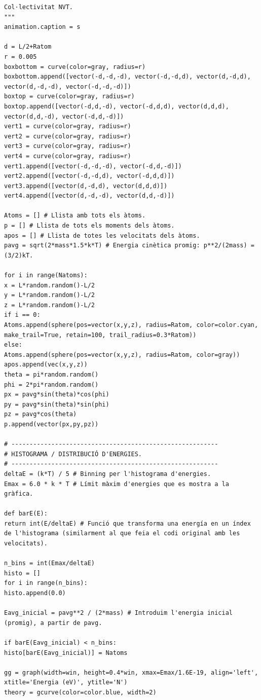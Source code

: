 \documentclass[a4paper,10.5pt]{report}
\begin{document}
\begin{appendices}
\begin{lstlisting}[caption={Distribució d'energies, energia total del sistema en funció del temps i fluctuacions relatives en l'energia total amb el termostat d'Andersen implementat (col·lectivitat NVT, canònica).}]
Col·lectivitat NVT.
"""
animation.caption = s

d = L/2+Ratom
r = 0.005
boxbottom = curve(color=gray, radius=r)
boxbottom.append([vector(-d,-d,-d), vector(-d,-d,d), vector(d,-d,d), vector(d,-d,-d), vector(-d,-d,-d)])
boxtop = curve(color=gray, radius=r)
boxtop.append([vector(-d,d,-d), vector(-d,d,d), vector(d,d,d), vector(d,d,-d), vector(-d,d,-d)])
vert1 = curve(color=gray, radius=r)
vert2 = curve(color=gray, radius=r)
vert3 = curve(color=gray, radius=r)
vert4 = curve(color=gray, radius=r)
vert1.append([vector(-d,-d,-d), vector(-d,d,-d)])
vert2.append([vector(-d,-d,d), vector(-d,d,d)])
vert3.append([vector(d,-d,d), vector(d,d,d)])
vert4.append([vector(d,-d,-d), vector(d,d,-d)])

Atoms = [] # Llista amb tots els àtoms.
p = [] # Llista de tots els moments dels àtoms.
apos = [] # Llista de totes les velocitats dels àtoms.
pavg = sqrt(2*mass*1.5*k*T) # Energia cinètica promig: p**2/(2mass) = (3/2)kT.

for i in range(Natoms):
x = L*random.random()-L/2
y = L*random.random()-L/2
z = L*random.random()-L/2
if i == 0:
Atoms.append(sphere(pos=vector(x,y,z), radius=Ratom, color=color.cyan, make_trail=True, retain=100, trail_radius=0.3*Ratom))
else:
Atoms.append(sphere(pos=vector(x,y,z), radius=Ratom, color=gray))
apos.append(vec(x,y,z)) 
theta = pi*random.random() 
phi = 2*pi*random.random()
px = pavg*sin(theta)*cos(phi) 
py = pavg*sin(theta)*sin(phi)
pz = pavg*cos(theta)
p.append(vector(px,py,pz)) 

# ---------------------------------------------------------
# HISTOGRAMA / DISTRIBUCIÓ D'ENERGIES.
# ---------------------------------------------------------
deltaE = (k*T) / 5 # Binning per l'histograma d'energies.
Emax = 6.0 * k * T # Límit màxim d'energies que es mostra a la gràfica.

def barE(E):
return int(E/deltaE) # Funció que transforma una energía en un índex de l'histograma (similarment al que feia el codi original amb les velocitats).

n_bins = int(Emax/deltaE)
histo = []
for i in range(n_bins):
histo.append(0.0)

Eavg_inicial = pavg**2 / (2*mass) # Introduim l'energia inicial (promig), a partir de pavg.

if barE(Eavg_inicial) < n_bins:
histo[barE(Eavg_inicial)] = Natoms

gg = graph(width=win, height=0.4*win, xmax=Emax/1.6E-19, align='left', 
xtitle='Energia (eV)', ytitle='N')
theory = gcurve(color=color.blue, width=2)



\end{lstlisting}
\end{appendices}
\end{document}

